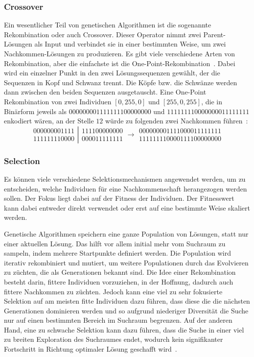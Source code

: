 \documentclass{article}
\begin{document}
\subsubsection{Crossover}
\label{sec:background-crossover}
Ein wesentlicher Teil von genetischen Algorithmen ist die sogenannte Rekombination oder auch Crossover. Dieser Operator nimmt zwei Parent-Lösungen als Input und verbindet sie in einer bestimmten Weise, um zwei Nachkommen-Lösungen zu produzieren. Es gibt viele verschiedene Arten von Rekombination, aber die einfachste ist die One-Point-Rekombination~\cite{McMinn_2004}. Dabei wird ein einzelner Punkt in den zwei Lösungssequenzen gewählt, der die Sequenzen in Kopf und Schwanz trennt. Die Köpfe bzw. die Schwänze werden dann zwischen den beiden Sequenzen ausgetauscht. Eine One-Point Rekombination von zwei Individuen $[0, 255, 0]$ und $[255, 0, 255]$, die in Binärform jeweils als $000000001111111100000000$ und $111111110000000011111111$ enkodiert wären, an der Stelle $12$ würde zu folgenden zwei Nachkommen führen~\cite{McMinn_2004}:
\[
\left.\begin{array}{c}
000000001111 \\  %
111111110000 %
\end{array}\right|
\begin{array}{c}
111100000000 \\  %
000011111111 %
\end{array} \longrightarrow
\begin{array}{c}
000000001111000011111111 \\  %
111111110000111100000000 %
\end{array}
\]


\subsubsection{Selection}
Es können viele verschiedene Selektionsmechanismen angewendet werden, um zu entscheiden, welche Individuen für eine Nachkommenschaft herangezogen werden sollen. Der Fokus liegt dabei auf der Fitness der Individuen. Der Fitnesswert kann dabei entweder direkt verwendet oder erst auf eine bestimmte Weise skaliert werden.

Genetische Algorithmen speichern eine ganze Population von Lösungen, statt nur einer aktuellen Lösung. Das hilft vor allem initial mehr vom Suchraum zu sampeln, indem mehrere Startpunkte definiert werden. Die Population wird iterativ rekombiniert und mutiert, um weitere Populationen durch das Evolvieren zu züchten, die als Generationen bekannt sind. Die Idee einer Rekombination besteht darin, fittere Individuen vorzuziehen, in der Hoffnung, dadurch auch fittere Nachkommen zu züchten. Jedoch kann eine viel zu sehr fokusierte Selektion auf am meisten fitte Individuen dazu führen, dass diese die die nächsten Generationen dominieren werden und so aufgrund niederiger Diversität die Suche nur auf einen bestimmten Bereich im Suchraum begrenzen. Auf der anderen Hand, eine zu schwache Selektion kann dazu führen, dass die Suche in einer viel zu breiten Exploration des Suchraumes endet, wodurch kein signifikanter Fortschritt in Richtung optimaler Lösung geschafft wird~\cite{McMinn_2004}.
\end{document}
